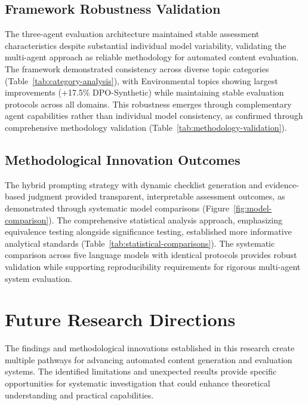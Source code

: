 \subsection{Framework Robustness Validation}

The three-agent evaluation architecture maintained stable assessment characteristics despite substantial individual model variability, validating the multi-agent approach as reliable methodology for automated content evaluation. The framework demonstrated consistency across diverse topic categories (Table~\ref{tab:category-analysis}), with Environmental topics showing largest improvements (+17.5\% DPO-Synthetic) while maintaining stable evaluation protocols across all domains. This robustness emerges through complementary agent capabilities rather than individual model consistency, as confirmed through comprehensive methodology validation (Table~\ref{tab:methodology-validation}).

\subsection{Methodological Innovation Outcomes}

The hybrid prompting strategy with dynamic checklist generation and evidence-based judgment provided transparent, interpretable assessment outcomes, as demonstrated through systematic model comparisons (Figure~\ref{fig:model-comparison}). The comprehensive statistical analysis approach, emphasizing equivalence testing alongside significance testing, established more informative analytical standards (Table~\ref{tab:statistical-comparisons}). The systematic comparison across five language models with identical protocols provides robust validation while supporting reproducibility requirements for rigorous multi-agent system evaluation.



\section{Future Research Directions}
\label{sec:future-directions}

The findings and methodological innovations established in this research create multiple pathways for advancing automated content generation and evaluation systems. The identified limitations and unexpected results provide specific opportunities for systematic investigation that could enhance theoretical understanding and practical capabilities.

